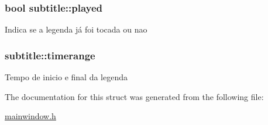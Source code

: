 \subsubsection[{played}]{\setlength{\rightskip}{0pt plus 5cm}bool subtitle\+::played}\label{structsubtitle_a12b5d59da640a60de07892449a14b06a}
Indica se a legenda já foi tocada ou nao \hypertarget{structsubtitle_ae3c12c11840733f601353d28bad10b26}{}
\subsubsection[{timerange}]{ subtitle\+::timerange}\label{structsubtitle_ae3c12c11840733f601353d28bad10b26}
Tempo de inicio e final da legenda 

The documentation for this struct was generated from the following file\+:\begin{DoxyCompactItemize}
\item 
\hyperlink{mainwindow_8h}{mainwindow.\+h}\end{DoxyCompactItemize}
